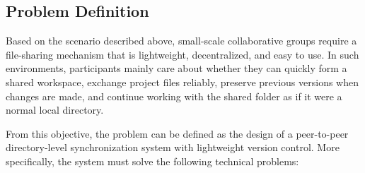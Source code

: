 \documentclass[11pt,oneside]{article}
\begin{document}
\subsection{Problem Definition}

Based on the scenario described above, small-scale collaborative groups require a file-sharing mechanism that is lightweight, decentralized, and easy to use. In such environments, participants mainly care about whether they can quickly form a shared workspace, exchange project files reliably, preserve previous versions when changes are made, and continue working with the shared folder as if it were a normal local directory.\par
From this objective, the problem can be defined as the design of a peer-to-peer directory-level synchronization system with lightweight version control. More specifically, the system must solve the following technical problems:
\end{document}

